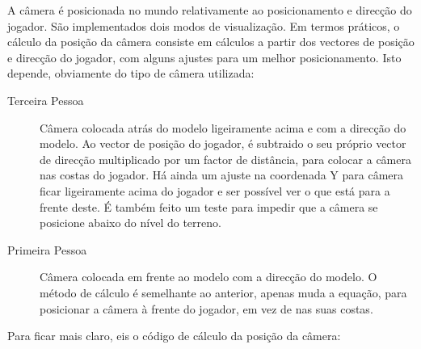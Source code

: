 


A câmera é posicionada no mundo relativamente ao posicionamento e direcção do jogador. São implementados dois modos de visualização.
Em termos práticos, o cálculo da posição da câmera consiste em cálculos a partir dos vectores de posição e direcção do jogador, com alguns ajustes para um melhor posicionamento. Isto depende, obviamente do tipo de câmera utilizada:

\begin{description}
\item[Terceira Pessoa] Câmera colocada atrás do modelo ligeiramente acima e com a direcção do modelo. Ao vector de posição do jogador, é subtraido o seu próprio vector de direcção multiplicado por um factor de distância, para colocar a câmera nas costas do jogador. Há ainda um ajuste na coordenada Y para câmera ficar ligeiramente acima do jogador e ser possível ver o que está para a frente deste. É também feito um teste para impedir que a câmera se posicione abaixo do nível do terreno.
\item[Primeira Pessoa] Câmera colocada em frente ao modelo com a direcção do modelo. O método de cálculo é semelhante ao anterior, apenas muda a equação, para posicionar a câmera à frente do jogador, em vez de nas suas costas.
\end{description}

Para ficar mais claro, eis o código de cálculo da posição da câmera:


